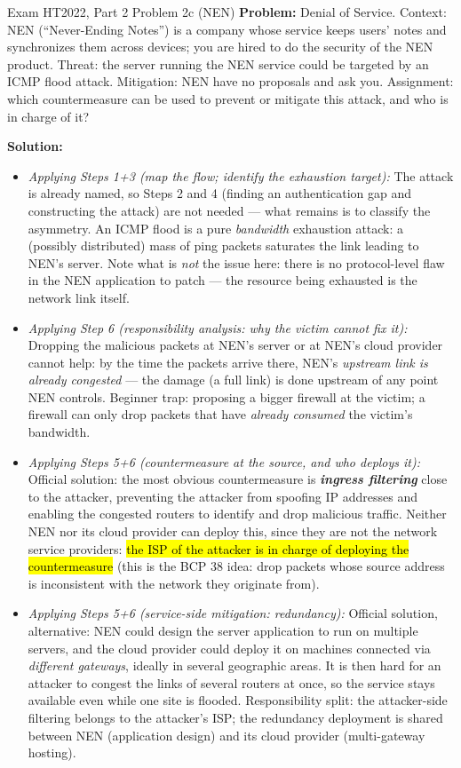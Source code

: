 \documentclass[12pt, a4paper]{article}
\newcommand{\term}[1]{\textbf{\textit{#1}}}        %
\newcommand{\imp}[1]{\hl{#1}}                       %
\begin{document}
\begin{practicebox}{Exam HT2022, Part 2 Problem 2c (NEN)}
\textbf{Problem:} Denial of Service. Context: NEN (``Never-Ending Notes'') is a company whose service keeps users' notes and synchronizes them across devices; you are hired to do the security of the NEN product. Threat: the server running the NEN service could be targeted by an ICMP flood attack. Mitigation: NEN have no proposals and ask you. Assignment: which countermeasure can be used to prevent or mitigate this attack, and who is in charge of it?

\textbf{Solution:}
\begin{itemize}
    \item \textit{Applying Steps 1+3 (map the flow; identify the exhaustion target):} The attack is already named, so Steps 2 and 4 (finding an authentication gap and constructing the attack) are not needed --- what remains is to classify the asymmetry. An ICMP flood is a pure \emph{bandwidth} exhaustion attack: a (possibly distributed) mass of ping packets saturates the link leading to NEN's server. Note what is \emph{not} the issue here: there is no protocol-level flaw in the NEN application to patch --- the resource being exhausted is the network link itself.
    \item \textit{Applying Step 6 (responsibility analysis: why the victim cannot fix it):} Dropping the malicious packets at NEN's server or at NEN's cloud provider cannot help: by the time the packets arrive there, NEN's \emph{upstream link is already congested} --- the damage (a full link) is done upstream of any point NEN controls. Beginner trap: proposing a bigger firewall at the victim; a firewall can only drop packets that have \emph{already consumed} the victim's bandwidth.
    \item \textit{Applying Steps 5+6 (countermeasure at the source, and who deploys it):} Official solution: the most obvious countermeasure is \term{ingress filtering} close to the attacker, preventing the attacker from spoofing IP addresses and enabling the congested routers to identify and drop malicious traffic. Neither NEN nor its cloud provider can deploy this, since they are not the network service providers: \imp{the ISP of the attacker is in charge of deploying the countermeasure} (this is the BCP 38 idea: drop packets whose source address is inconsistent with the network they originate from).
    \item \textit{Applying Steps 5+6 (service-side mitigation: redundancy):} Official solution, alternative: NEN could design the server application to run on multiple servers, and the cloud provider could deploy it on machines connected via \emph{different gateways}, ideally in several geographic areas. It is then hard for an attacker to congest the links of several routers at once, so the service stays available even while one site is flooded. Responsibility split: the attacker-side filtering belongs to the attacker's ISP; the redundancy deployment is shared between NEN (application design) and its cloud provider (multi-gateway hosting).

\end{itemize}
\end{practicebox}
\end{document}
